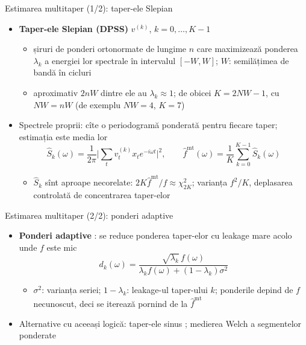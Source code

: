 \begin{frame}{Estimarea multitaper (1/2): taper-ele Slepian}
\itemsize{\small}
\begin{itemize}
    \item \textbf{Taper-ele Slepian (DPSS)} $v^{(k)}$, $k = 0, \dots, K - 1$ 
    \begin{itemize}
        \item șiruri de ponderi ortonormate de lungime $n$ care maximizează ponderea $\lambda_k$ a energiei lor spectrale în intervalul $[-W, W]$; $W$: semilățimea de bandă în cicluri
        \item aproximativ $2nW$ dintre ele au $\lambda_k \approx 1$; de obicei $K = 2NW - 1$, cu $NW = nW$ (de exemplu $NW = 4$, $K = 7$)
    \end{itemize}
    \item Spectrele proprii: cîte o periodogramă ponderată pentru fiecare taper; estimația este media lor
    \[ \hat S_k(\omega) = \frac{1}{2\pi}\Big|\sum_tv_t^{(k)}x_te^{-i\omega t}\Big|^2, \qquad \hat f^{\mathrm{mt}}(\omega) = \frac1K\sum_{k=0}^{K-1}\hat S_k(\omega) \]
    \begin{itemize}
        \item $\hat S_k$ sînt aproape necorelate: $2K\hat f^{\mathrm{mt}}/f \approx \chi^2_{2K}$; varianța $f^2/K$, deplasarea controlată de concentrarea taper-elor
    \end{itemize}
\end{itemize}
\end{frame}

\begin{frame}{Estimarea multitaper (2/2): ponderi adaptive}
\itemsize{\small}
\begin{itemize}
    \item \textbf{Ponderi adaptive} : se reduce ponderea taper-elor cu leakage mare acolo unde $f$ este mic
    \[ d_k(\omega) = \frac{\sqrt{\lambda_k}\,f(\omega)}{\lambda_kf(\omega) + (1 - \lambda_k)\sigma^2} \]
    \begin{itemize}
        \item $\sigma^2$: varianța seriei; $1 - \lambda_k$: leakage-ul taper-ului $k$; ponderile depind de $f$ necunoscut, deci se iterează pornind de la $\hat f^{\mathrm{mt}}$
    \end{itemize}
    \item Alternative cu aceeași logică: taper-ele sinus ; medierea Welch a segmentelor ponderate 
\end{itemize}
\end{frame}

